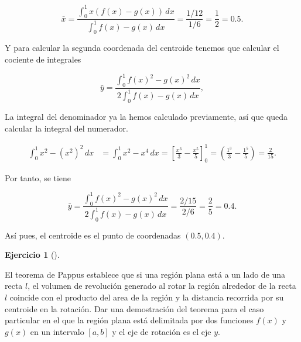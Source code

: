 \documentclass[
  a4paper,
]{scrreport}
\theoremstyle{definition}
\newtheorem{exercise}{Ejercicio}[chapter]
\theoremstyle{remark}
\begin{document}
\begin{tcolorbox}
\[
\bar x = \frac{\int_0^1 x (f(x)-g(x))\,dx}{\int_0^1f(x)-g(x)\,dx}
= \frac{1/12}{1/6}
= \frac{1}{2}
= 0.5.
\]

Y para calcular la segunda coordenada del centroide tenemos que calcular
el cociente de integrales

\[
\bar y = \frac{\int_0^1 f(x)^2-g(x)^2\,dx}{2\int_0^1f(x)-g(x)\,dx}, 
\]

La integral del denominador ya la hemos calculado previamente, así que
queda calcular la integral del numerador.

\begin{align*}
\int_0^1 x^2 - (x^2)^2\,dx
&= \int_0^1 x^2-x^4\,dx
= \left[\frac{x^3}{3}-\frac{x^5}{5}\right]_0^1
= \left(\frac{1^3}{3}-\frac{1^5}{5}\right)
= \frac{2}{15}.
\end{align*}

Por tanto, se tiene

\[
\bar y = \frac{\int_0^1 f(x)^2-g(x)^2\,dx}{2\int_0^1f(x)-g(x)\,dx}
= \frac{2/15}{2/6} 
= \frac{2}{5}
= 0.4.
\]

Así pues, el centroide es el punto de coordenadas \((0.5, 0.4)\).

\end{tcolorbox}

\begin{exercise}[]\protect\hypertarget{exr-teorema-pappus}{}\label{exr-teorema-pappus}

El teorema de Pappus establece que si una región plana está a un lado de
una recta \(l\), el volumen de revolución generado al rotar la región
alrededor de la recta \(l\) coincide con el producto del area de la
región y la distancia recorrida por su centroide en la rotación. Dar una
demostración del teorema para el caso particular en el que la región
plana está delimitada por dos funciones \(f(x)\) y \(g(x)\) en un
intervalo \([a,b]\) y el eje de rotación es el eje \(y\).

\end{exercise}
\end{document}
